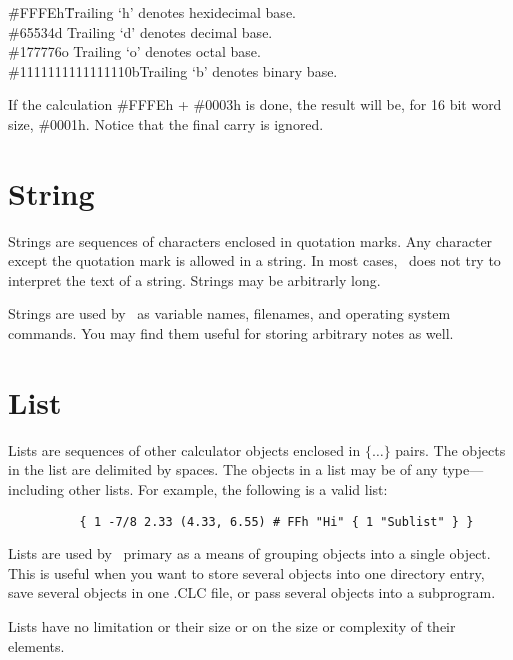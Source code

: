 \documentclass{report}
\begin{document}
\begin{tabbing}

\hspace*{3em}\=\#FFFEh\hspace{6em}\=Trailing `h' denotes hexidecimal base.\\
\>             \#65534d\>           Trailing `d' denotes decimal base.\\
\>             \#177776o\>          Trailing `o' denotes octal base.\\
\>             \#1111111111111110b\>Trailing `b' denotes binary base.

\end{tabbing}

If the calculation \#FFFEh + \#0003h is done, the result will be, for 16 bit word size, \#0001h.
Notice that the final carry is ignored.

\section{String}

Strings are sequences of characters enclosed in quotation marks. Any character except the
quotation mark is allowed in a string. In most cases, \CLAC\ does not try to interpret the text
of a string. Strings may be arbitrarly long.

Strings are used by \CLAC\ as variable names, filenames, and operating system commands. You may
find them useful for storing arbitrary notes as well.

\section{List}

Lists are sequences of other calculator objects enclosed in $\{\ldots\}$ pairs. The objects in
the list are delimited by spaces. The objects in a list may be of any type---including other
lists. For example, the following is a valid list:

\begin{verbatim}
          { 1 -7/8 2.33 (4.33, 6.55) # FFh "Hi" { 1 "Sublist" } }
\end{verbatim}

Lists are used by \CLAC\ primary as a means of grouping objects into a single object. This is
useful when you want to store several objects into one directory entry, save several objects in
one .CLC file, or pass several objects into a subprogram.

Lists have no limitation or their size or on the size or complexity of their elements.
\end{document}
